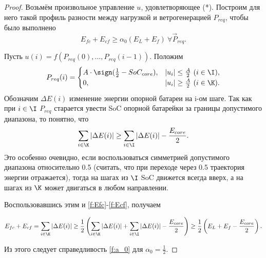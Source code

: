 \begin{proof}
Возьмём произвольное управление $u$, удовлетворяющее (*).
Построим для него такой профиль разности между нагрузкой и ветрогенерацией $P_{req}$, чтобы было выполнено \begin{equation}
\label{f:a_0}
    E_{fc} + E_{cf} \geq \alpha_0 (E_{L} + E_f) ~\forall \Vec{P}_{req}.
\end{equation}

Пусть $u(i) = f(P_{req}(0), \ldots, P_{req}(i-1))$. 
Положим $$
P_{req}(i) = \begin{cases}
A\cdot \sign(\frac{1}{2} - SoC_{core}), &|u_i| \leq \frac{A}{2}~ (i \in \I),\\
0, &|u_i| \geq \frac{A}{2}~ (i \in \K).
\end{cases}
$$
Обозначим $\Delta E(i)$ изменение энергии опорной батареи на i-ом шаге.
Так как при $i \in \I$ $P_{req}$ старается увести SoC опорной батарейки за границы допустимого диапазона, то понятно, что
$$\sum_{i \in \K}{|\Delta E(i)|} \geq \sum_{i \in \I}{|\Delta E(i)|} -\frac{E_{core}}{2} .$$
Это особенно очевидно, если воспользоваться симметрией допустимого диапазона относительно 0.5 (считать, что при переходе через 0.5 траектория энергии отражается), тогда на шагах из $\I$ SoC движется всегда вверх, а на шагах из $\K$ может двигаться в любом направлении.

Воспользовавшись этим и \ref{f:Efc}-\ref{f:Ecf}, получаем

$$
E_{fc} + E_{cf} %
= \sum_{i \in \K}{|\Delta E(i)|} \geq 
\frac{1}{2} \left(\sum_{i \in \K}{|\Delta E(i)|} + \sum_{i \in \I}{|\Delta E(i)|} -  \frac{E_{core}}{2} \right) \geq
\frac{1}{2} \left(E_{L} + E_f - \frac{E_{core}}{2}\right).
$$





Из этого следует справедливость \ref{f:a_0} для $\alpha_0 = \frac{1}{2}$.

\end{proof}

